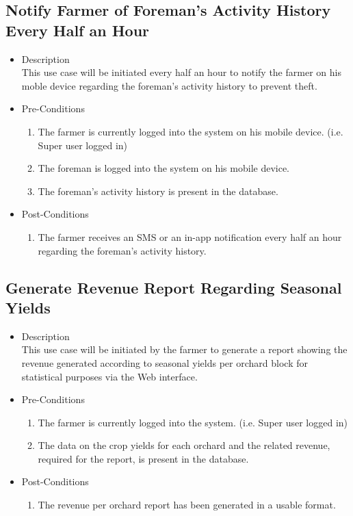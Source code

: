 \documentclass[11pt,fleqn]{book} %
\begin{document}
		\subsection{Notify Farmer of Foreman’s Activity History Every Half an Hour}
		\begin{itemize}
			\item Description\\
			This use case will be initiated every half an hour to notify the farmer on his moble device regarding the foreman’s activity history to prevent theft.
			\item Pre-Conditions
			\begin{enumerate}
				\item The farmer is currently logged into the system on his mobile device. (i.e. Super user logged in)
				\item The foreman is logged into the system on his mobile device.
				\item The foreman’s activity history is present in the database.					
			\end{enumerate}
			\item Post-Conditions
			\begin{enumerate}
				\item The farmer receives an SMS or an in-app notification every half an hour regarding the foreman’s activity history.
			\end{enumerate}
		\end{itemize}
		
		\subsection{Generate Revenue Report Regarding Seasonal Yields}
		\begin{itemize}
			\item Description\\
			This use case will be initiated by the farmer to generate a report showing the revenue generated according to seasonal yields per orchard block for statistical purposes via the Web interface.
			\item Pre-Conditions
			\begin{enumerate}
				\item The farmer is currently logged into the system. (i.e. Super user logged in)
				\item The data on the crop yields for each orchard and the related revenue, required for the report, is present in the database.	
			\end{enumerate}
			\item Post-Conditions
			\begin{enumerate}
				\item The revenue per orchard report has been generated in a usable format.
			\end{enumerate}
		\end{itemize}
		
\end{document}
